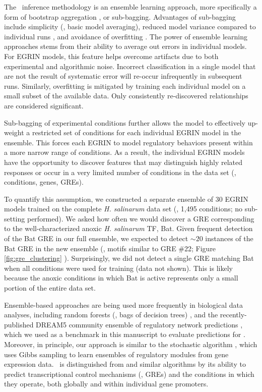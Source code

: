 The \egrine~inference methodology is an ensemble learning approach,
more specifically a form of bootstrap
aggregation \cite{Breiman96baggingpredictors}, or sub-bagging.
Advantages of sub-bagging include simplicity (\ie, basic model
averaging), reduced model variance
compared to individual runs \cite{Buhlmann2002}, and avoidance of
overfitting \cite{Krogh1997}. The power of ensemble learning
approaches stems from their ability to average out errors in
individual models. For EGRIN models, this feature
helps overcome artifacts due to both experimental and algorithmic
noise. Incorrect classification in a single model that are not the result
of systematic error will re-occur infrequently 
in subsequent runs. Similarly, overfitting is mitigated by training
each individual model on a small subset of the available data. Only consistently re-discovered
relationships are considered significant.

Sub-bagging of experimental conditions further allows the model to
effectively up-weight a restricted set of conditions for each
individual EGRIN model in the ensemble. This forces each EGRIN to
model regulatory behaviors present within a more narrow range of
conditions. As a result, the individual EGRIN models have the
opportunity to discover features that
may distinguish highly related responses or occur in a very limited
number of conditions in the data set (\eg, conditions, genes, GREs). 

To quantify this assumption, we constructed a
separate ensemble of 30 EGRIN models trained on the
complete {\it H. salinarum} data set (\ie, 1,495 conditions; no
sub-setting performed). We asked how often we would discover a GRE
corresponding to the well-characterized anoxic \textit{H. salinarum} TF, Bat. 
Given frequent detection of the Bat GRE in our full
ensemble, we expected to detect $\sim 20$ instances of the Bat GRE in the new ensemble
(\ie, motifs similar to GRE \#22;
Figure \ref{fig:gre_clustering} \cite{Baliga2001}). Surprisingly, we did
not detect a single GRE matching Bat when
all conditions were used for training (data not shown). 
This is likely because the anoxic conditions
in which Bat is active represents only
a small portion of the entire data set.

Ensemble-based approaches are being used more frequently in biological
data analyses, including random forests (\ie, bags of decision trees)
\cite{breiman2001}, and the recently-published DREAM5 community 
ensemble of regulatory network predictions \cite{Marbach2012}, which
we used as a benchmark in this manuscript to evaluate \egrine
predictions for \eco. Moreover, in principle, our approach is similar
to the stochastic  algorithm \cite{Joshi2009}, which
uses Gibbs sampling to learn ensembles of regulatory modules from gene
expression data. \egrine~is distinguished from  and
similar algorithms by its ability to predict transcriptional control
mechanisms (\ie, GREs) and the conditions in which they operate, both
globally and within individual gene promoters.

